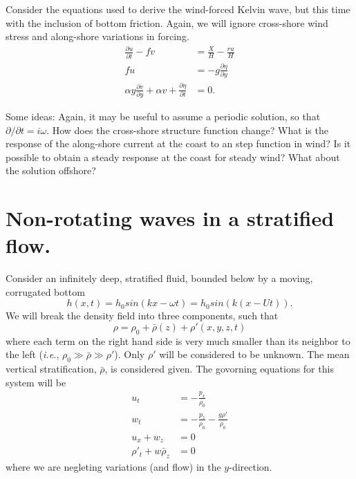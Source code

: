 \documentclass[11pt]{report}
\numberwithin{equation}{section}
\begin{document}
Consider the equations used to derive the wind-forced Kelvin wave, but this time with the inclusion of bottom friction.  Again, we will ignore cross-shore wind stress and along-shore variations in forcing.
\begin{align}
\frac{\partial u}{\partial t} - fv &=  \frac{X}{H} - \frac{r u}{H} \\
    f u &= -g\frac{\partial \eta}{\partial y}  \\
    \alpha y \frac{\partial v}{\partial y} + \alpha v + \frac{\partial \eta}{\partial t} &= 0. 
\end{align}

Some ideas:  Again, it may be useful to assume a periodic solution, so that $\partial/\partial t = i \omega$.  How does the cross-shore structure function change?  What is the response of the along-shore current at the coast to an step function in wind?  Is it possible to obtain a steady response at the coast for steady wind?  What about the solution offshore?

\clearpage
\section{Non-rotating waves in a stratified flow.}
\label{prob:stratified_waves}

Consider an infinitely deep, stratified fluid, bounded below by a moving,
corrugated bottom
\begin{equation}
h(x,t) = h_0 sin (k x - \omega t) = h_0 sin (k (x - U t)).
\end{equation}
We will break the density field into three components, such that
\begin{equation}
\rho = \rho_0 + \bar{\rho}(z) + \rho'(x,y,z,t)
\end{equation}
where each term on the right hand side is very much smaller than its
neighbor to the left (\emph{i.e.}, $\rho_0 \gg \bar{\rho} \gg \rho'$).  Only
$\rho'$ will be considered to be unknown.  The mean vertical
stratification, $\bar{\rho}$, is considered given.  The govorning equations for this system will be
\begin{align}
u_t &= -\frac{p_x}{\rho_0} \\
w_t &= -\frac{p_z}{\rho_0} - \frac{g \rho'}{\rho_0} \\
u_x + w_z &= 0 \\
\rho'_t + w \bar{\rho}_z &= 0
\end{align}
where we are negleting variations (and flow) in the $y$-direction.
\end{document}
